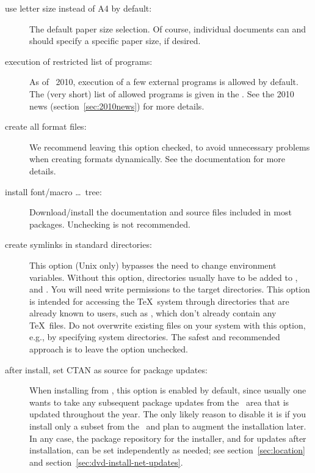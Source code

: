 \documentclass{article}
\begin{document}
\begin{description}
\item[use letter size instead of A4 by default:] The default paper
  size selection.  Of course, individual documents can and should
  specify a specific paper size, if desired.

\item[execution of restricted list of programs:] As of \TL\ 2010,
  execution of a few external programs is allowed by default.  The (very
  short) list of allowed programs is given in the .
  See the 2010 news (section~\ref{sec:2010news}) for more details.

\item[create all format files:] We recommend leaving this option
  checked, to avoid unnecessary problems when creating formats
  dynamically.  See the  documentation for more details.

\item[install font/macro \ldots\ tree:] Download/install the
  documentation and source files included in most packages.  Unchecking
  is not recommended.

\item[create symlinks in standard directories:]
  This option (Unix only) bypasses the need to change environment
  variables. Without this option, \TL{} directories usually have to be
  added to ,  and . You
  will need write permissions to the target directories.  This option is
  intended for accessing the \TeX\ system through directories that are
  already known to users, such as , which don't
  already contain any \TeX\ files.  Do not overwrite existing files on
  your system with this option, e.g., by specifying system directories.
  The safest and recommended approach is to leave the option unchecked.

\item[after install, set CTAN as source for package updates:]
  When installing from \DVD, this
  option is enabled by default, since usually one wants to take any
  subsequent package updates from the \CTAN\ area that is updated
  throughout the year.  The only likely reason to disable it is if you
  install only a subset from the \DVD\ and plan to augment the
  installation later.  In any case, the package repository for the
  installer, and for updates after installation, can be set
  independently as needed; see section~\ref{sec:location} and
  section~\ref{sec:dvd-install-net-updates}.
\end{description}
\end{document}
